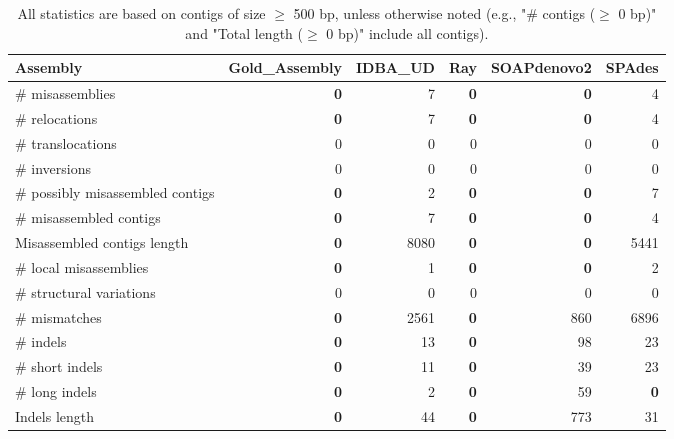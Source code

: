 \documentclass[12pt,a4paper]{article}
\begin{document}
\begin{table}[ht]
\begin{center}
\caption{All statistics are based on contigs of size $\geq$ 500 bp, unless otherwise noted (e.g., "\# contigs ($\geq$ 0 bp)" and "Total length ($\geq$ 0 bp)" include all contigs).}
\begin{tabular}{|l*{5}{|r}|}
\hline
Assembly & Gold\_Assembly & IDBA\_UD & Ray & SOAPdenovo2 & SPAdes \\ \hline
\# misassemblies & {\bf 0} & 7 & {\bf 0} & {\bf 0} & 4 \\ \hline
\hspace{5mm}\# relocations & {\bf 0} & 7 & {\bf 0} & {\bf 0} & 4 \\ \hline
\hspace{5mm}\# translocations & 0 & 0 & 0 & 0 & 0 \\ \hline
\hspace{5mm}\# inversions & 0 & 0 & 0 & 0 & 0 \\ \hline
\# possibly misassembled contigs & {\bf 0} & 2 & {\bf 0} & {\bf 0} & 7 \\ \hline
\# misassembled contigs & {\bf 0} & 7 & {\bf 0} & {\bf 0} & 4 \\ \hline
Misassembled contigs length & {\bf 0} & 8080 & {\bf 0} & {\bf 0} & 5441 \\ \hline
\# local misassemblies & {\bf 0} & 1 & {\bf 0} & {\bf 0} & 2 \\ \hline
\# structural variations & 0 & 0 & 0 & 0 & 0 \\ \hline
\# mismatches & {\bf 0} & 2561 & {\bf 0} & 860 & 6896 \\ \hline
\# indels & {\bf 0} & 13 & {\bf 0} & 98 & 23 \\ \hline
\hspace{5mm}\# short indels & {\bf 0} & 11 & {\bf 0} & 39 & 23 \\ \hline
\hspace{5mm}\# long indels & {\bf 0} & 2 & {\bf 0} & 59 & {\bf 0} \\ \hline
Indels length & {\bf 0} & 44 & {\bf 0} & 773 & 31 \\ \hline
\end{tabular}
\end{center}
\end{table}
\end{document}
